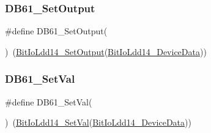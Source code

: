 \mbox{\label{group___d_b61__module_ga49d3c58b27d0ca6730264d9e17f4ac00}} 
\subsubsection{\texorpdfstring{D\+B61\+\_\+\+Set\+Output}{DB61\_SetOutput}}
{\footnotesize\ttfamily \#define D\+B61\+\_\+\+Set\+Output(\begin{DoxyParamCaption}{ }\end{DoxyParamCaption})~(\hyperlink{group___bit_io_ldd14__module_ga92faf92eda5aee7a1ee9aae450d3b062}{Bit\+Io\+Ldd14\+\_\+\+Set\+Output}(\hyperlink{group___bit_io_ldd14__module_ga73f5611a097a03f5f36a403f6b6e9fff}{Bit\+Io\+Ldd14\+\_\+\+Device\+Data}))}

\mbox{\label{group___d_b61__module_ga794b427c7a45cf554609a590981197ea}} 
\subsubsection{\texorpdfstring{D\+B61\+\_\+\+Set\+Val}{DB61\_SetVal}}
{\footnotesize\ttfamily \#define D\+B61\+\_\+\+Set\+Val(\begin{DoxyParamCaption}{ }\end{DoxyParamCaption})~(\hyperlink{group___bit_io_ldd14__module_gafc0efe9c15e9975b1707af654e976785}{Bit\+Io\+Ldd14\+\_\+\+Set\+Val}(\hyperlink{group___bit_io_ldd14__module_ga73f5611a097a03f5f36a403f6b6e9fff}{Bit\+Io\+Ldd14\+\_\+\+Device\+Data}))}

